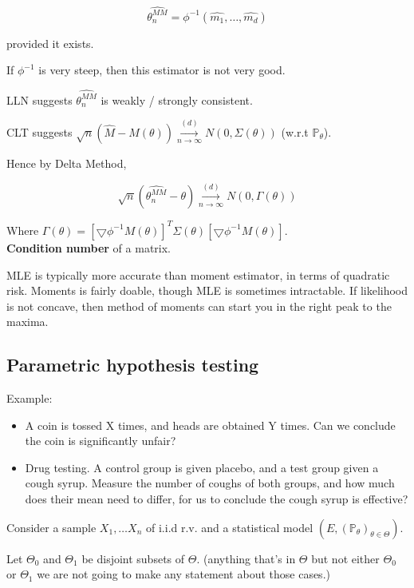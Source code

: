 \documentclass{article}
\begin{document}
$$
\hat{\theta_n^{MM}} = \phi^{-1}(\hat{m_1}, \dots, \hat{m_d})
$$

provided it exists.

If $\phi^{-1}$ is very steep, then this estimator is not very good.

LLN suggests $\hat{\theta_n^{MM}}$ is weakly / strongly consistent.

CLT suggests $\sqrt{n} (\hat{M} - M(\theta)) \overset{(d)}{\underset{n \to \infty}{\longrightarrow}} \mathit{N}(0, \Sigma(\theta))$ (w.r.t $\mathbb{P}_{\theta}$).

Hence by Delta Method,

$$
\sqrt{n} (\hat{\theta^{MM}_n} - \theta) \overset{(d)}{\underset{n \to \infty}{\longrightarrow}} \mathit{N}(0, \Gamma(\theta))
$$

Where $\Gamma(\theta) = [\bigtriangledown \phi^{-1} M(\theta)]^T \Sigma(\theta) [\bigtriangledown \phi^{-1} M(\theta)]$.
\\

\textbf{Condition number} of a matrix.

MLE is typically more accurate than moment estimator, in terms of quadratic risk.
Moments is fairly doable, though MLE is sometimes intractable.
If likelihood is not concave, then method of moments can start you in the right peak to the maxima.


\subsection{Parametric hypothesis testing}

Example:
\begin{itemize}
\item A coin is tossed X times, and heads are obtained Y times. Can we conclude the coin is significantly unfair?
\item Drug testing. A control group is given placebo, and a test group given a cough syrup. Measure the number of coughs of both groups, and how much does their mean need to differ, for us to conclude the cough syrup is effective?
\end{itemize}

Consider a sample $X_1, \dots X_n$ of i.i.d r.v. and a statistical model $(E, (\mathbb{P}_\theta)_{\theta \in \Theta})$.

Let $\Theta_0$ and $\Theta_1$ be disjoint subsets of $\Theta$. (anything that's in $\Theta$ but not either $\Theta_0$ or $\Theta_1$ we are not going to make any statement about those cases.)
\end{document}
